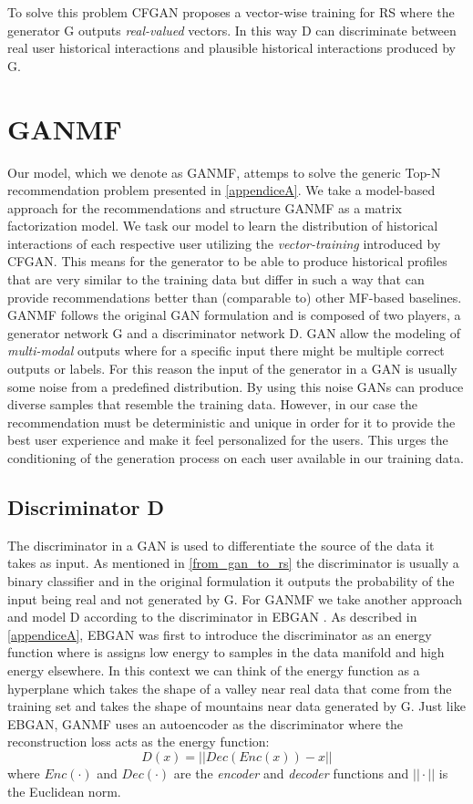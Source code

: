 To solve this problem CFGAN proposes a vector-wise training for RS where the generator G outputs \emph{real-valued} vectors. In this way D can discriminate between real user historical interactions and plausible historical interactions produced by G.

\section{GANMF}
\label{sec:GANMF}
Our model, which we denote as GANMF, attemps to solve the generic Top-N recommendation problem presented in \ref{appendiceA}. We take a model-based approach for the recommendations and structure GANMF as a matrix factorization model. We task our model to learn the distribution of historical interactions of each respective user utilizing the \emph{vector-training} introduced by CFGAN. This means for the generator to be able to produce historical profiles that are very similar to the training data but differ in such a way that can provide recommendations better than (comparable to) other MF-based baselines. GANMF follows the original GAN formulation and is composed of two players, a generator network G and a discriminator network D. GAN allow the modeling of \emph{multi-modal} outputs \cite{goodfellow2016nips} where for a specific input there might be multiple correct outputs or labels. For this reason the input of the generator in a GAN is usually some noise from a predefined distribution. By using this noise GANs can produce diverse samples that resemble the training data. However, in our case the recommendation must be deterministic and unique in order for it to provide the best user experience and make it feel personalized for the users. This urges the conditioning of the generation process on each user available in our training data.

\subsection{Discriminator D}
\label{sec:GANMF_D}
The discriminator in a GAN is used to differentiate the source of the data it takes as input. As mentioned in \ref{from_gan_to_rs} the discriminator is usually a binary classifier and in the original formulation it outputs the probability of the input being real and not generated by G. For GANMF we take another approach and model D according to the discriminator in EBGAN \cite{zhao2016energy}. As described in \ref{appendiceA}, EBGAN was first to introduce the discriminator as an energy function where is assigns low energy to samples in the data manifold and high energy elsewhere. In this context we can think of the energy function as a hyperplane which takes the shape of a valley near real data that come from the training set and takes the shape of mountains near data generated by G. Just like EBGAN, GANMF uses an autoencoder \cite{kramer1991nonlinear} as the discriminator where the reconstruction loss acts as the energy function:
\begin{equation}
    D(x) = ||Dec(Enc(x)) - x||
    \label{eq:recon_loss}
\end{equation}
where $Enc(\cdot)$ and $Dec(\cdot)$ are the \emph{encoder} and \emph{decoder} functions and $||\cdot||$ is the Euclidean norm.

